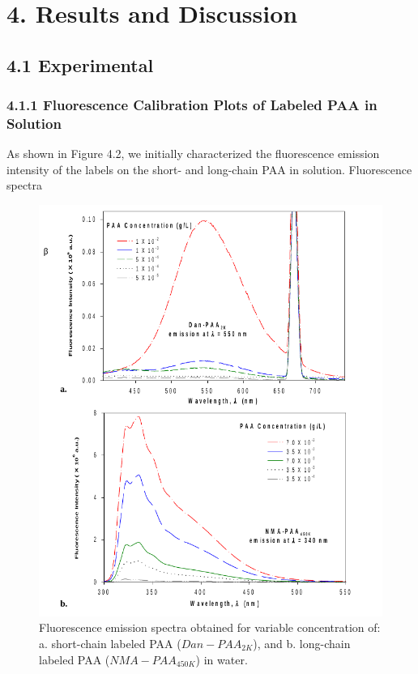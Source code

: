 \documentclass[journal=mamobx,manuscript=article]{achemso}
\begin{document}
\section{4. Results and Discussion}

\subsection{4.1 Experimental}

\subsubsection{4.1.1 Fluorescence Calibration Plots of Labeled PAA in Solution}

As shown in Figure 4.2, we initially characterized the fluorescence emission intensity of the labels on the short- and long-chain PAA in solution.  Fluorescence spectra

\begin{figure}[H]
\includegraphics[scale=0.5]{fig2.png}
\caption{Fluorescence emission spectra obtained for variable concentration of: a. short-chain labeled PAA ($Dan-PAA_{2K}$), and b. long-chain labeled PAA ($NMA-PAA_{450K}$) in water.}
\label{figure 2}
\end{figure}
\end{document}
